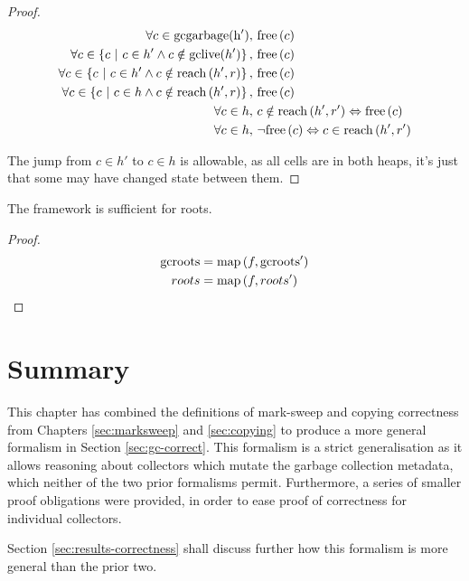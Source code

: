 \begin{proof}
  \begin{align*}
    \forall c \in \mathrm{gcgarbage(h')},\ & \mathrm{free}\left(c\right)\\
    \forall c \in \left\{c~|~c \in h' \land c \notin
      \mathrm{gclive}(h')\right\},\ & \mathrm{free}\left(c\right)\\
    \forall c \in \left\{c~|~c \in h' \land c \notin
      \mathrm{reach}\left(h', r\right)\right\},\ & \mathrm{free}\left(c\right)\\
    \forall c \in \left\{c~|~c \in h \land c \notin
      \mathrm{reach}\left(h', r\right)\right\},\ & \mathrm{free}\left(c\right)\\
    \forall c \in h,\ & c \notin \mathrm{reach}\left(h', r'\right) \Leftrightarrow \mathrm{free}\left(c\right)\\
    \forall c \in h,\ & \lnot\mathrm{free}\left(c\right) \Leftrightarrow c \in \mathrm{reach}\left(h', r'\right)
  \end{align*}

  The jump from $c \in h'$ to $c \in h$ is allowable, as all cells are
  in both heaps, it's just that some may have changed state between
  them.
\end{proof}

\begin{lemma}[Roots]
  The framework is sufficient for roots.
\end{lemma}

\begin{proof}
  \begin{align*}
    \mathrm{gcroots} &= \mathrm{map}\left(f, \mathrm{gcroots'}\right)\\
    roots &= \mathrm{map}\left(f, roots'\right)
  \end{align*}
\end{proof}

\section{Summary}
\label{sec:gc-summary}

This chapter has combined the definitions of mark-sweep and copying
correctness from Chapters \ref{sec:marksweep} and \ref{sec:copying} to
produce a more general formalism in Section \ref{sec:gc-correct}. This
formalism is a strict generalisation as it allows reasoning about
collectors which mutate the garbage collection metadata, which neither
of the two prior formalisms permit. Furthermore, a series of smaller
proof obligations were provided, in order to ease proof of correctness
for individual collectors.

Section \ref{sec:results-correctness} shall discuss further how this
formalism is more general than the prior two.
